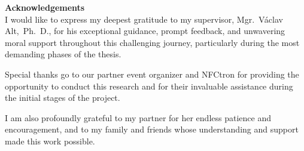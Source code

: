 \newpage
\pagestyle{empty}

\noindent
{\large\bfseries Acknowledgements}\\

\noindent
I would like to express my deepest gratitude to my supervisor, Mgr.~Václav Alt,~Ph.~D., for his exceptional guidance, prompt feedback,
and unwavering moral support throughout this challenging journey, particularly during the most demanding phases of the thesis.

Special thanks go to our partner event organizer and NFCtron for providing the opportunity to conduct this research and for their invaluable assistance during the initial stages of the project.

I am also profoundly grateful to my partner for her endless patience and encouragement, and to my family and friends whose understanding and support made this work possible.